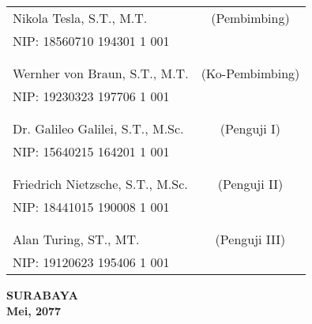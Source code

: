     \noindent
    \begin{tabularx}{\textwidth}{X c}
      Nikola Tesla, S.T., M.T.          & (Pembimbing) \\
      NIP: 18560710 194301 1 001        & \\
      &  \\
      &  \\
      Wernher von Braun, S.T., M.T.     & (Ko-Pembimbing) \\
      NIP: 19230323 197706 1 001        & \\
      &  \\
      &  \\
      Dr. Galileo Galilei, S.T., M.Sc.  & (Penguji I) \\
      NIP: 15640215 164201 1 001        & \\
      &  \\
      &  \\
      Friedrich Nietzsche, S.T., M.Sc.  & (Penguji II) \\
      NIP: 18441015 190008 1 001        & \\
      &  \\
      &  \\
      Alan Turing, ST., MT.             & (Penguji III) \\
      NIP: 19120623 195406 1 001        & \\
    \end{tabularx}
  \endgroup

  \vspace{4ex}

  \begin{center}
    \textbf{SURABAYA} \\
    \textbf{Mei, 2077}
  \end{center}
\endgroup
